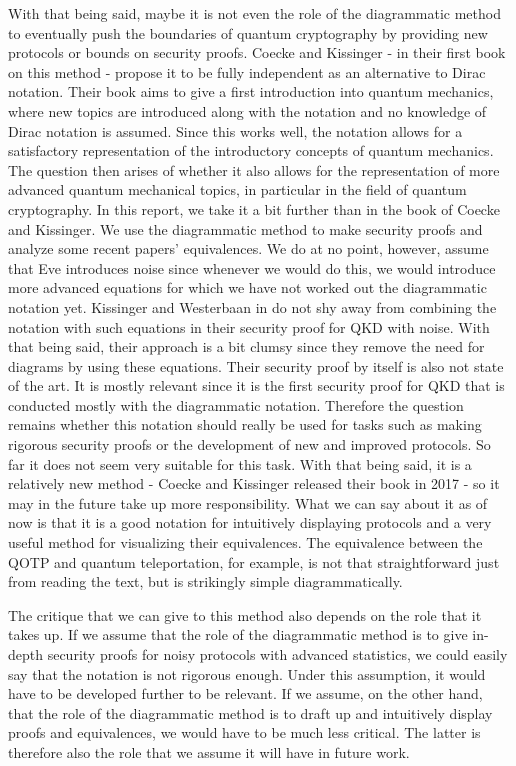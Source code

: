 \documentclass[]{article}
\begin{document}
With that being said, maybe it is not even the role of the diagrammatic method to eventually push the boundaries of quantum cryptography by providing new protocols or bounds on security proofs. Coecke and Kissinger - in their first book on this method - propose it to be fully independent as an alternative to Dirac notation. Their book aims to give a first introduction into quantum mechanics, where new topics are introduced along with the notation and no knowledge of Dirac notation is assumed. Since this works well, the notation allows for a satisfactory representation of the introductory concepts of quantum mechanics. The question then arises of whether it also allows for the representation of more advanced quantum mechanical topics, in particular in the field of quantum cryptography. In this report, we take it a bit further than in the book of Coecke and Kissinger. We use the diagrammatic method to make security proofs and analyze some recent papers' equivalences. We do at no point, however, assume that Eve introduces noise since whenever we would do this, we would introduce more advanced equations for which we have not worked out the diagrammatic notation yet. Kissinger and Westerbaan in \cite{Kissinger2017} do not shy away from combining the notation with such equations in their security proof for QKD with noise. With that being said, their approach is a bit clumsy since they remove the need for diagrams by using these equations. Their security proof by itself is also not state of the art. It is mostly relevant since it is the first security proof for QKD that is conducted mostly with the diagrammatic notation. Therefore the question remains whether this notation should really be used for tasks such as making rigorous security proofs or the development of new and improved protocols. So far it does not seem very suitable for this task. With that being said, it is a relatively new method - Coecke and Kissinger released their book in 2017 \cite{Coecke2017} - so it may in the future take up more responsibility. What we can say about it as of now is that it is a good notation for intuitively displaying protocols and a very useful method for visualizing their equivalences. The equivalence between the QOTP and quantum teleportation, for example, is not that straightforward just from reading the text, but is strikingly simple diagrammatically. 

The critique that we can give to this method also depends on the role that it takes up. If we assume that the role of the diagrammatic method is to give in-depth security proofs for noisy protocols with advanced statistics, we could easily say that the notation is not rigorous enough. Under this assumption, it would have to be developed further to be relevant. If we assume, on the other hand, that the role of the diagrammatic method is to draft up and intuitively display proofs and equivalences, we would have to be much less critical. The latter is therefore also the role that we assume it will have in future work. 
\end{document}

